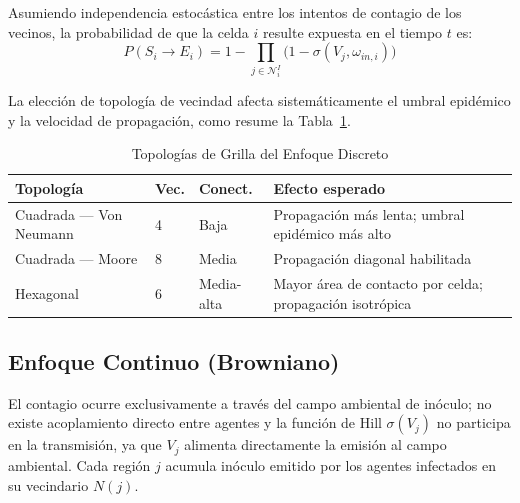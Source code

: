 \documentclass[conference]{IEEEtran}
\begin{document}
Asumiendo independencia estocástica entre los intentos de contagio de los vecinos, la probabilidad de que la celda $i$ resulte expuesta en el tiempo $t$ es:
\begin{equation}
P(S_i \to E_i) = 1 - \prod_{j \in \mathcal{N}_i^I} \bigl(1 - \sigma(V_j, \omega_{in,i})\bigr)
\end{equation}

La elección de topología de vecindad afecta sistemáticamente el umbral epidémico y la velocidad de propagación, como resume la Tabla~\ref{tab:topologia}.

\begin{table}[!t]
\renewcommand{\arraystretch}{1.3}
\caption{Topologías de Grilla del Enfoque Discreto}
\label{tab:topologia}
\centering
\begin{tabular}{p{1.9cm}p{0.7cm}p{1.1cm}p{2.9cm}}
\hline
\textbf{Topología} & \textbf{Vec.} & \textbf{Conect.} & \textbf{Efecto esperado} \\
\hline
Cuadrada --- Von Neumann & 4 & Baja & Propagación más lenta; umbral epidémico más alto \\
Cuadrada --- Moore & 8 & Media & Propagación diagonal habilitada \\
Hexagonal & 6 & Media-alta & Mayor área de contacto por celda; propagación isotrópica \\
\hline
\end{tabular}
\end{table}

\subsection{Enfoque Continuo (Browniano)}
El contagio ocurre exclusivamente a través del campo ambiental de inóculo; no existe acoplamiento directo entre agentes y la función de Hill $\sigma(V_j)$ no participa en la transmisión, ya que $V_j$ alimenta directamente la emisión al campo ambiental. Cada región $j$ acumula inóculo emitido por los agentes infectados en su vecindario $N(j)$.
\end{document}
